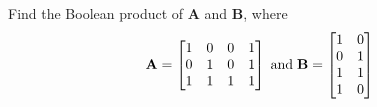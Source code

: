 
%
%
%

	Find the Boolean product of $\mathbf{A}$ and $\mathbf{B}$, where
	$$
	\mathbf{A} =
	\begin{bmatrix}
		1 & 0 & 0 & 1 \\
		0 & 1 & 0 & 1 \\
		1 & 1 & 1 & 1
	\end{bmatrix}
	\text{\;and\;}
	\mathbf{B} =
	\begin{bmatrix}
		1 & 0 \\
		0 & 1 \\
		1 & 1 \\
		1 & 0 \\
	\end{bmatrix}
	$$

\solution

